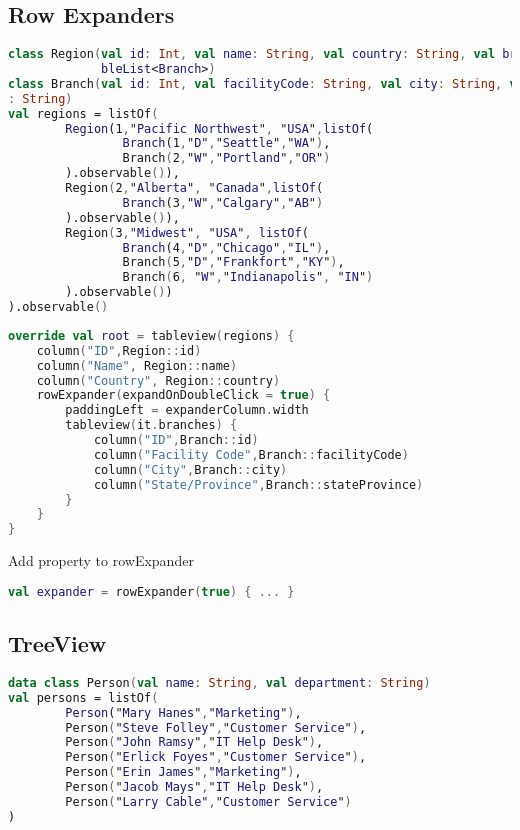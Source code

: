 \documentclass[12pt]{article}
\begin{document}
\subsection{Row Expanders}
\begin{lstlisting}[language=Kotlin]
class Region(val id: Int, val name: String, val country: String, val branches: Observa
             bleList<Branch>)
class Branch(val id: Int, val facilityCode: String, val city: String, val stateProvince
: String)
val regions = listOf(
        Region(1,"Pacific Northwest", "USA",listOf(
                Branch(1,"D","Seattle","WA"),
                Branch(2,"W","Portland","OR")
        ).observable()),
        Region(2,"Alberta", "Canada",listOf(
                Branch(3,"W","Calgary","AB")
        ).observable()),
        Region(3,"Midwest", "USA", listOf(
                Branch(4,"D","Chicago","IL"),
                Branch(5,"D","Frankfort","KY"),
                Branch(6, "W","Indianapolis", "IN")
        ).observable())
).observable()
\end{lstlisting}

\begin{lstlisting}[language=Kotlin]
override val root = tableview(regions) {
    column("ID",Region::id)
    column("Name", Region::name)
    column("Country", Region::country)
    rowExpander(expandOnDoubleClick = true) {
        paddingLeft = expanderColumn.width
        tableview(it.branches) {
            column("ID",Branch::id)
            column("Facility Code",Branch::facilityCode)
            column("City",Branch::city)
            column("State/Province",Branch::stateProvince)
        }
    }
}
\end{lstlisting}
Add property to rowExpander
\begin{lstlisting}[language=Kotlin]
val expander = rowExpander(true) { ... }
\end{lstlisting}

\subsection{TreeView}

\begin{lstlisting}[language=Kotlin]
data class Person(val name: String, val department: String)
val persons = listOf(
        Person("Mary Hanes","Marketing"),
        Person("Steve Folley","Customer Service"),
        Person("John Ramsy","IT Help Desk"),
        Person("Erlick Foyes","Customer Service"),
        Person("Erin James","Marketing"),
        Person("Jacob Mays","IT Help Desk"),
        Person("Larry Cable","Customer Service")
)
\end{lstlisting}
\end{document}
